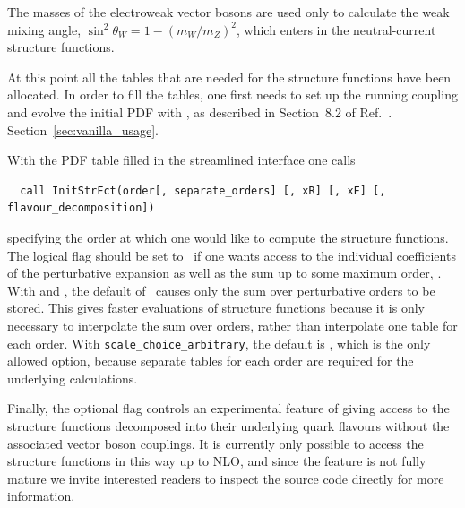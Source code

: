 The masses of the electroweak vector bosons are used only to calculate
the weak mixing angle, $\sin^2 \theta_W = 1 - (m_W/m_Z)^2$, which
enters in the neutral-current structure functions.

At this point all the tables that are needed for the structure
functions have been allocated.
%
In order to fill the tables, one first needs to set up the running
coupling and evolve the initial PDF with , as
described in
\ifreleasenote
Section~8.2 of Ref.~\cite{Salam:2008qg}.
\else
Section~\ref{sec:vanilla_usage}.
\fi

%
%
With the PDF table filled in the streamlined interface one calls
\begin{lstlisting}
  call InitStrFct(order[, separate_orders] [, xR] [, xF] [, flavour_decomposition])
\end{lstlisting}
specifying the order at which one would like to compute the structure
functions.
%
The logical flag  should be set to \ if one
wants access to the individual coefficients of the perturbative
expansion as well as the sum up to some maximum order, .
%
With  and , the
default of \ causes only the sum over perturbative orders
to be stored.
%
This gives faster evaluations of structure functions because it is
only necessary to interpolate the sum over orders, rather than
interpolate one table for each order.
%
With \texttt{scale\_choice\_arbitrary}, the default is ,
which is the only allowed option, because separate tables for each
order are required for the underlying calculations.

Finally, the optional flag  controls an
experimental feature of giving access to the structure functions
decomposed into their underlying quark flavours without the associated
vector boson couplings. It is currently only possible to access the
structure functions in this way up to NLO, and since the feature is
not fully mature we invite interested readers to inspect the source
code directly for more information.

